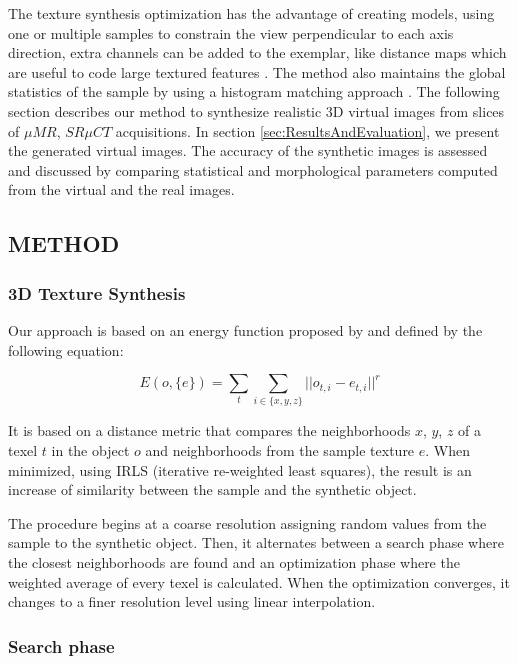 The texture synthesis optimization has the advantage of creating models, using one or multiple samples 
to constrain the view perpendicular to each axis direction, extra channels can be added to the exemplar, like distance maps 
which are useful to code large textured features \cite{Lefebvre:2006:ATS:1141911.1141921}.
The method also maintains the global statistics of the sample by using a histogram matching approach \cite{ROLLAND2000}.
The following section describes our method to synthesize realistic 3D virtual images from slices of $\mu{MR}$, $SR \mu{CT}$ acquisitions.
In section \ref{sec:ResultsAndEvaluation}, we present the generated virtual images. 
The accuracy of the synthetic images is assessed and discussed by comparing statistical and morphological parameters computed from the virtual and the real images. 


\subsection{\uppercase{Method}}
\label{sec:Methods}
\subsubsection{3D Texture Synthesis}
\label{sec:TextureSynthesis}

Our approach is based on an energy function 
proposed by \cite{kwatra:2005:SIGGRAPH} and defined by the following equation:

\begin{equation}
 E(o, \{e\} ) = \sum_{t} \sum_{i \in \{x, y, z\}} || o_{t, i} - e_{t, i} ||^r
 \label{equ:imagenergy} 
\end{equation}

It is based on a distance metric that compares the neighborhoods $x$, $y$, $z$ 
of a texel $t$ in the object $o$ and neighborhoods from the sample texture $e$. 
When minimized, using IRLS (iterative re-weighted least squares), 
the result is an increase of similarity between the sample and the synthetic object.

The procedure begins at a coarse resolution assigning random values from the sample to the synthetic object. 
Then, it alternates between a search phase where the closest neighborhoods are found 
and an optimization phase where the weighted average of every texel is calculated. 
When the optimization converges, it changes to a finer resolution level using linear interpolation.

\subsubsection{Search phase}
\label{sec:SearchPhase}

